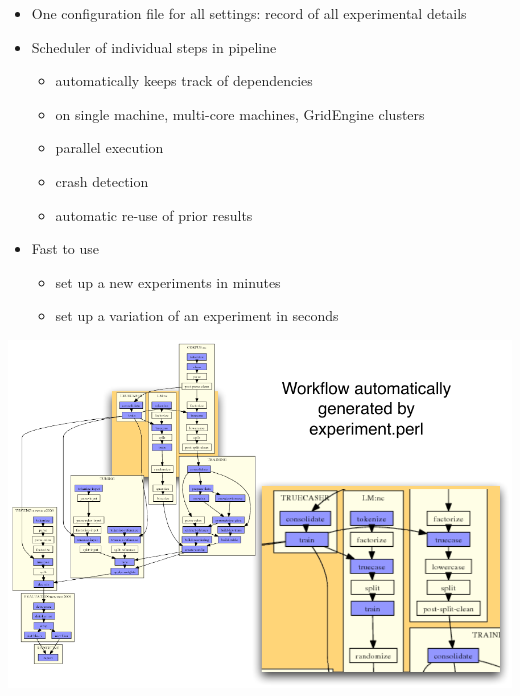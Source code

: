 \documentclass[landscape]{uedslides2C}
\begin{document}
\begin{itemize}
\item One configuration file for all settings: record of all experimental details
\item Scheduler of individual steps in pipeline
\begin{itemize}
\item automatically keeps track of dependencies
\item on single machine, multi-core machines, GridEngine clusters
\item parallel execution 
\item crash detection
\item automatic re-use of prior results
\end{itemize}
\item Fast to use
\begin{itemize}
\item set up a new experiments in minutes
\item set up a variation of an experiment in seconds
\end{itemize}
\end{itemize}


\slide{}
\begin{center} \vspace{-5mm}
\includegraphics[scale=1.41]{ems-agenda-composite.pdf}
\end{center}

\end{document}
